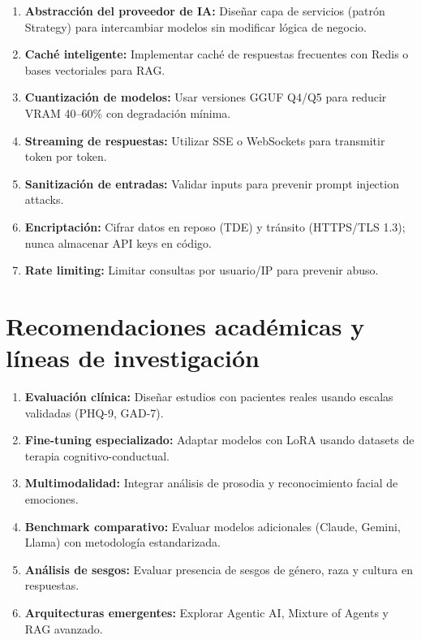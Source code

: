 \documentclass[12pt,a4paper]{report}
\numberwithin{figure}{section}
\begin{document}
\begin{enumerate}
    \item \textbf{Abstracción del proveedor de IA:} Diseñar capa de servicios (patrón Strategy) para intercambiar modelos sin modificar lógica de negocio.
    \item \textbf{Caché inteligente:} Implementar caché de respuestas frecuentes con Redis o bases vectoriales para RAG.
    \item \textbf{Cuantización de modelos:} Usar versiones GGUF Q4/Q5 para reducir VRAM 40--60\% con degradación mínima.
    \item \textbf{Streaming de respuestas:} Utilizar SSE o WebSockets para transmitir token por token.
    \item \textbf{Sanitización de entradas:} Validar inputs para prevenir prompt injection attacks.
    \item \textbf{Encriptación:} Cifrar datos en reposo (TDE) y tránsito (HTTPS/TLS 1.3); nunca almacenar API keys en código.
    \item \textbf{Rate limiting:} Limitar consultas por usuario/IP para prevenir abuso.
\end{enumerate}

\vspace{1em}

\section[Recomendaciones académicas]{Recomendaciones académicas y líneas de investigación}
\label{sec:recomendaciones_academicas}

\begin{enumerate}
    \item \textbf{Evaluación clínica:} Diseñar estudios con pacientes reales usando escalas validadas (PHQ-9, GAD-7).
    \item \textbf{Fine-tuning especializado:} Adaptar modelos con LoRA usando datasets de terapia cognitivo-conductual.
    \item \textbf{Multimodalidad:} Integrar análisis de prosodia y reconocimiento facial de emociones.
    \item \textbf{Benchmark comparativo:} Evaluar modelos adicionales (Claude, Gemini, Llama) con metodología estandarizada.
    \item \textbf{Análisis de sesgos:} Evaluar presencia de sesgos de género, raza y cultura en respuestas.
    \item \textbf{Arquitecturas emergentes:} Explorar Agentic AI, Mixture of Agents y RAG avanzado.
\end{enumerate}
\end{document}
